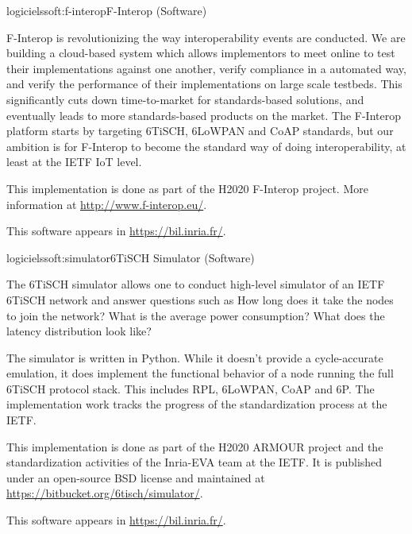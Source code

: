 \documentclass{ra2016}
\begin{document}
\begin{module}{logiciels}{soft:f-interop}{F-Interop (Software)}

\begin{participants}
\end{participants}

F-Interop is revolutionizing the way interoperability events are conducted.
We are building a cloud-based system which allows implementors to meet online to test their implementations against one another, verify compliance in a automated way, and verify the performance of their implementations on large scale testbeds.
This significantly cuts down time-to-market for standards-based solutions, and eventually leads to more standards-based products on the market.
The F-Interop platform starts by targeting 6TiSCH, 6LoWPAN and CoAP standards, but our ambition is for F-Interop to become the standard way of doing interoperability, at least at the IETF IoT level.

This implementation is done as part of the H2020 F-Interop project.
More information at \url{http://www.f-interop.eu/}.

This software appears in \url{https://bil.inria.fr/}.

\end{module}

\begin{module}{logiciels}{soft:simulator}{6TiSCH Simulator (Software)}

\begin{participants}
\end{participants}

The 6TiSCH simulator allows one to conduct high-level simulator of an IETF 6TiSCH network and answer questions such as
How long does it take the nodes to join the network?
What is the average power consumption?
What does the latency distribution look like?

The simulator is written in Python.
While it doesn't provide a cycle-accurate emulation, it does implement the functional behavior of a node running the full 6TiSCH protocol stack.
This includes RPL, 6LoWPAN, CoAP and 6P. The implementation work tracks the progress of the standardization process at the IETF.

This implementation is done as part of the H2020 ARMOUR project and the standardization activities of the Inria-EVA team at the IETF.
It is published under an open-source BSD license and maintained at \url{https://bitbucket.org/6tisch/simulator/}.

This software appears in \url{https://bil.inria.fr/}.

\end{module}
\end{document}
